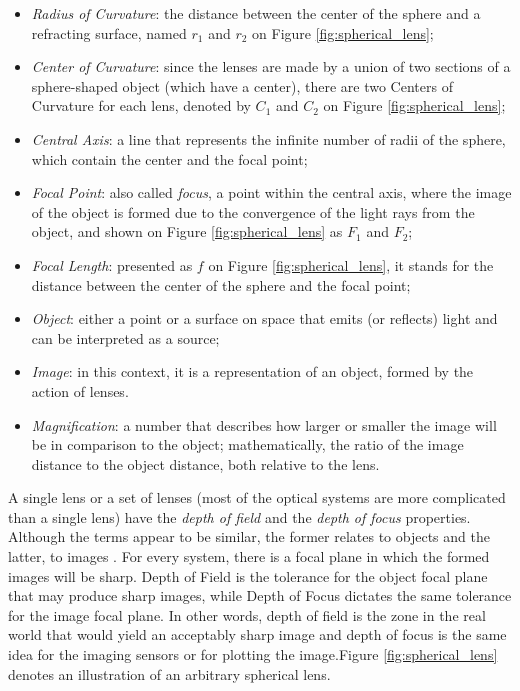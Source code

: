 \begin{itemize}
    \item \emph{Radius of Curvature}: the distance between the center of the sphere and a refracting surface, named $\mathit{r_{1}}$ and $\mathit{r_{2}}$ on Figure \ref{fig:spherical_lens};
    
    \item \emph{Center of Curvature}: since the lenses are made by a union of two sections of a sphere-shaped object (which have a center), there are two Centers of Curvature for each lens, denoted by $\mathit{C_{1}}$ and $\mathit{C_{2}}$ on Figure \ref{fig:spherical_lens};
    
    \item \emph{Central Axis}: a line that represents the infinite number of radii of the sphere, which contain the center and the focal point;
    
    \item \emph{Focal Point}: also called \emph{focus}, a point within the central axis, where the image of the object is formed due to the convergence of the light rays from the object, and shown on Figure \ref{fig:spherical_lens} as $\mathit{F_{1}}$ and $\mathit{F_{2}}$;
    
    \item \emph{Focal Length}: presented as $\mathit{f}$ on Figure \ref{fig:spherical_lens}, it stands for the distance between the center of the sphere and the focal point;
    
    \item \emph{Object}: either a point or a surface on space that emits (or reflects) light and can be interpreted as a source;
    
    \item \emph{Image}: in this context, it is a representation of an object, formed by the action of lenses.
    
    \item \emph{Magnification}: a number that describes how larger or smaller the image will be in comparison to the object; mathematically, the ratio of the image distance to the object distance, both relative to the lens.
    
\end{itemize}

A single lens or a set of lenses (most of the optical systems are more complicated than a single lens) have the \emph{depth of field} and the \emph{depth of focus} properties. Although the terms appear to be similar, the former relates to objects and the latter, to images \cite{davidson2002optical}. For every system, there is a focal plane in which the formed images will be sharp. Depth of Field is the tolerance for the object focal plane that may produce sharp images, while Depth of Focus dictates the same tolerance for the image focal plane. In other words, depth of field is the zone in the real world that would yield an acceptably sharp image and depth of focus is the same idea for the imaging sensors or for plotting the image.Figure \ref{fig:spherical_lens} denotes an illustration of an arbitrary spherical lens.

